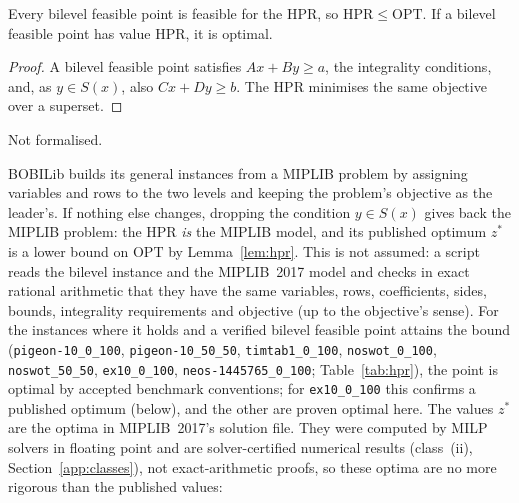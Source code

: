 \begin{lemma}\label{lem:hpr}
Every bilevel feasible point is feasible for the HPR, so
$\mathrm{HPR}\le\mathrm{OPT}$. If a bilevel feasible point has value
$\mathrm{HPR}$, it is optimal.
\end{lemma}
\begin{proof}
A bilevel feasible point satisfies $Ax+By\ge a$, the integrality conditions,
and, as $y\in S(x)$, also $Cx+Dy\ge b$. The HPR minimises the same objective
over a superset.
\end{proof}
\noindent Not formalised.

BOBILib builds its general instances from a MIPLIB problem by assigning
variables and rows to the two levels and keeping the problem's objective as
the leader's. If nothing else changes, dropping the condition $y\in S(x)$
gives back the MIPLIB problem: the HPR \emph{is} the MIPLIB model, and its
published optimum\cite{gleixner2021miplib} $z^{*}$ is a lower bound on $\mathrm{OPT}$ by
Lemma~\ref{lem:hpr}. This is not assumed: a script reads the bilevel
instance and the MIPLIB~2017 model and checks in exact rational arithmetic
that they have the same variables, rows, coefficients, sides, bounds,
integrality requirements and objective (up to the objective's sense). For
the \NumHprWithPublished{} instances where it holds and a verified bilevel feasible point
attains the bound (\texttt{pigeon-10\_0\_100}, \texttt{pigeon-10\_50\_50},
\texttt{timtab1\_0\_100}, \texttt{noswot\_0\_100}, \texttt{noswot\_50\_50},
\texttt{ex10\_0\_100}, \texttt{neos-1445765\_0\_100}; Table~\ref{tab:hpr}),
the point is optimal by accepted benchmark conventions; for
\texttt{ex10\_0\_100} this confirms a published optimum (below), and the other
\NumHprOptimal{} are proven optimal here. The values $z^{*}$
are the optima in MIPLIB~2017's solution file. They were computed by MILP
solvers in floating point and are solver-certified numerical results
(class~(ii), Section~\ref{app:classes}), not exact-arithmetic proofs, so these
optima are no more rigorous than the published values:
